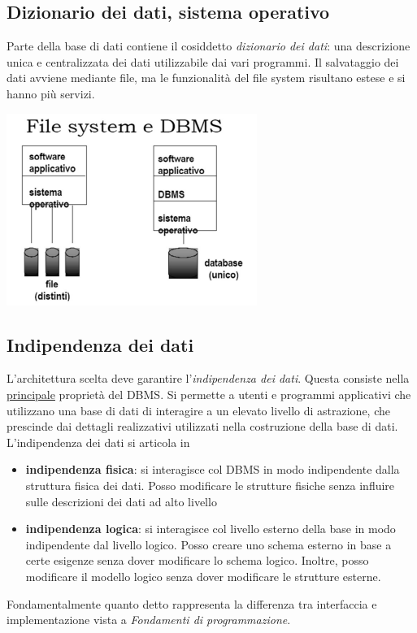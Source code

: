 \subsection{Dizionario dei dati, sistema operativo} Parte della base di dati contiene il cosiddetto \emph{dizionario dei dati}: una descrizione unica e centralizzata dei dati utilizzabile dai vari programmi. Il salvataggio dei dati avviene mediante file, ma le funzionalità del file system risultano estese e si hanno più servizi.
\begin{center}
	\includegraphics{images/1.png}
\end{center}
\subsection{Indipendenza dei dati} 
L'architettura scelta deve garantire l'\emph{indipendenza dei dati}. Questa consiste nella \underline{principale} proprietà del DBMS. Si permette a utenti e programmi applicativi che utilizzano una base di dati di interagire a un elevato livello di astrazione, che prescinde dai dettagli realizzativi utilizzati nella costruzione della base di dati. L'indipendenza dei dati si articola in
\begin{itemize}
	\item \textbf{indipendenza fisica}: si interagisce col DBMS in modo indipendente dalla struttura fisica dei dati. Posso modificare le strutture fisiche senza influire sulle descrizioni dei dati ad alto livello
	\item \textbf{indipendenza logica}: si interagisce col livello esterno della base in modo indipendente dal livello logico. Posso creare uno schema esterno in base a certe esigenze senza dover modificare lo schema logico. Inoltre, posso modificare il modello logico senza dover modificare le strutture esterne.
\end{itemize}
Fondamentalmente quanto detto rappresenta la differenza tra interfaccia e implementazione vista a \emph{Fondamenti di programmazione}.
